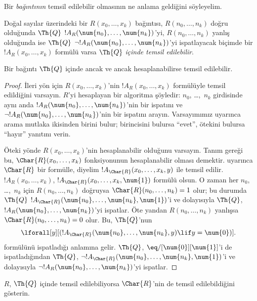 \documentclass[../../../include/open-logic-section]{subfiles}
\begin{document}


Bir \emph{bağıntının} temsil edilebilir olmasının ne anlama geldiğini
söyleyelim.

\begin{defn}
 Doğal sayılar üzerindeki bir
$R(x_0,\dots,x_k)$ bağıntısı, $R(n_0,\dots,n_k)$ doğru olduğunda $\Th{Q}$
$!A_R(\num{n_0},\dots,\num{n_k})$'yi, $R(n_0,\dots,n_k)$ yanlış olduğunda ise $\Th{Q}$
$\lnot !A_R(\num{n_0},\dots,\num{n_k})$'yi ispatlayacak biçimde bir
$!A_R(x_0,\dots,x_k)$ formülü varsa {\em $\Th{Q}$ içinde temsil
edilebilir}.
\end{defn}

\begin{thm}
 Bir bağıntı $\Th{Q}$ içinde ancak ve ancak
hesaplanabilirse temsil edilebilir.
\end{thm}

\begin{proof}
İleri yön için $R(x_0,\dots,x_k)$'nin $!A_R(x_0,\dots,x_k)$ formülüyle
temsil edildiğini varsayın. $R$'yi hesaplayan bir algoritma şöyledir:
$n_0$, \dots,~$n_k$ girdisinde aynı anda
$!A_R(\num{n_0},\dots,\num{n_k})$'nin bir ispatını ve
$\lnot !A_R(\num{n_0},\dots,\num{n_k})$'nin bir ispatını arayın.
Varsayımımız uyarınca arama mutlaka ikisinden birini bulur; birincisini
bulursa ``evet'', ötekini bulursa ``hayır'' yanıtını verin.

Öteki yönde $R(x_0,\dots,x_k)$'nin hesaplanabilir olduğunu varsayın. Tanım
gereği bu, $\Char{R}(x_0,\dots,x_k)$ fonksiyonunun hesaplanabilir olması
demektir.  uyarınca $\Char{R}$ bir
formülle, diyelim $!A_{\Char{R}}(x_0,\dots,x_k,y)$ ile temsil edilir.
$!A_R(x_0,\dots,x_k)$, $!A_{\Char{R}}(x_0,\dots,x_k,\num{1})$ formülü
olsun. O zaman her $n_0$, \dots,~$n_k$ için $R(n_0,\dots,n_k)$ doğruysa
$\Char{R}(n_0,\dots,n_k)=1$ olur; bu durumda $\Th{Q}$
$!A_{\Char{R}}(\num{n_0},\dots,\num{n_k},\num{1})$'i ve dolayısıyla
$\Th{Q}$, $!A_R(\num{n_0},\dots,\num{n_k})$'yi ispatlar. Öte yandan
$R(n_0,\dots,n_k)$ yanlışsa $\Char{R}(n_0,\dots,n_k)=0$ olur. Bu,
$\Th{Q}$'nun
\[
\lforall[y][(!A_{\Char{R}}(\num{n_0}, \dots, \num{n_k}, y) \lif y =
  \num{0})].
\]
formülünü ispatladığı anlamına gelir. $\Th{Q}$,
$\eq/[\num{0}][\num{1}]$'i de ispatladığından $\Th{Q}$,
$\lnot !A_{\Char{R}}(\num{n_0},\dots,\num{n_k},\num{1})$'i ve dolayısıyla
$\lnot !A_R(\num{n_0},\dots,\num{n_k})$'yi ispatlar.
\end{proof}

\begin{prob}
$R$, $\Th{Q}$ içinde temsil edilebiliyorsa $\Char{R}$'nin de temsil
edilebildiğini gösterin.
\end{prob}
\end{document}
